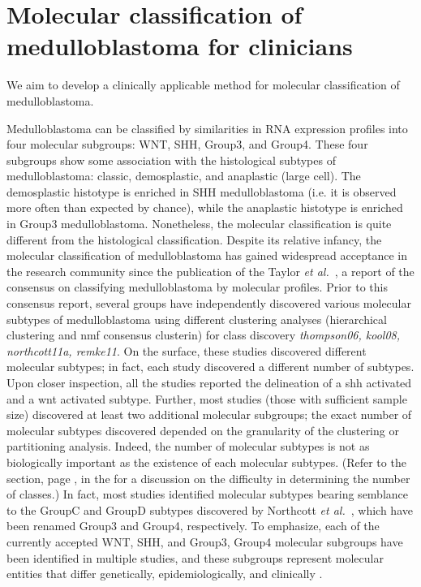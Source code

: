 \chapter{Molecular classification of medulloblastoma for clinicians}
\label{ch:mb-class}

\begin{objective}
We aim to develop a clinically applicable method for molecular classification of medulloblastoma.
\end{objective}

Medulloblastoma can be classified by similarities in RNA expression profiles into four molecular subgroups: WNT, SHH, Group3, and Group4. These four subgroups show some association with the histological subtypes of medulloblastoma: classic, demosplastic, and anaplastic (large cell). The demosplastic histotype is enriched in SHH medulloblastoma (i.e. it is observed more often than expected by chance), while the anaplastic histotype is enriched in Group3 medulloblastoma. Nonetheless, the molecular classification is quite different from the histological classification. Despite its relative infancy, the molecular classification of medulloblastoma has gained widespread acceptance in the research community since the publication of the Taylor \emph{et al.}\ , a report of the consensus on classifying medulloblastoma by molecular profiles. Prior to this consensus report, several groups have independently discovered various molecular subtypes of medulloblastoma using different clustering analyses (hierarchical clustering and \gls{nmf} consensus clusterin) for class discovery \emph{thompson06, kool08, northcott11a, remke11}. On the surface, these studies discovered different molecular subtypes; in fact, each study discovered a different number of subtypes. Upon closer inspection, all the studies reported the delineation of a \gls{shh} activated and a \gls{wnt} activated subtype. Further, most studies (those with sufficient sample size) discovered at least two additional molecular subgroups; the exact number of molecular subtypes discovered depended on the granularity of the clustering or partitioning analysis. Indeed, the number of molecular subtypes is not as biologically important as the existence of each molecular subtypes. (Refer to the  section, page \pageref{sec:classification}, in the  for a discussion on the difficulty in determining the number of classes.) In fact, most studies identified molecular subtypes bearing semblance to the GroupC and GroupD subtypes discovered by Northcott \emph{et al.}\ , which have been renamed Group3 and Group4, respectively. To emphasize, each of the currently accepted WNT, SHH, and Group3, Group4 molecular subgroups have been identified in multiple studies, and these subgroups represent molecular entities that differ genetically, epidemiologically, and clinically .

